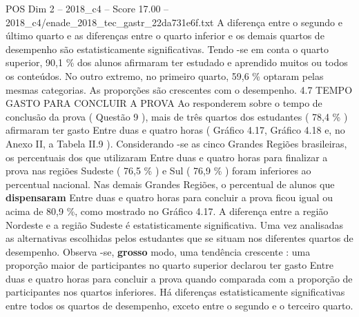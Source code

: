 \begin{textsample}{POS Dim 2 – 2018\_c4 – Score 17.00 – 2018\_c4/enade\_2018\_tec\_gastr\_22da731e6f.txt}
A diferença entre o segundo e último quarto e as diferenças entre o quarto inferior e os demais quartos de desempenho são estatisticamente significativas.
Tendo -se em conta o quarto superior, 90,1 \% dos alunos afirmaram ter estudado e aprendido muitos ou todos os conteúdos.
No outro extremo, no primeiro quarto, 59,6 \% optaram pelas mesmas categorias.
As proporções são crescentes com o desempenho. 4.7 TEMPO GASTO PARA CONCLUIR A PROVA Ao responderem sobre o tempo de conclusão da prova ( Questão 9 ), mais de três quartos dos estudantes ( 78,4 \% ) afirmaram ter gasto Entre duas e quatro horas ( Gráfico 4.17, Gráfico 4.18 e, no Anexo II, a Tabela II.9 ).
Considerando -se as cinco Grandes Regiões brasileiras, os percentuais dos que utilizaram Entre duas e quatro horas para finalizar a prova nas regiões Sudeste ( 76,5 \% ) e Sul ( 76,9 \% ) foram inferiores ao percentual nacional.
Nas demais Grandes Regiões, o percentual de alunos que \textbf{dispensaram} Entre duas e quatro horas para concluir a prova ficou igual ou acima de 80,9 \%, como mostrado no Gráfico 4.17.
A diferença entre a região Nordeste e a região Sudeste é estatisticamente significativa.
Uma vez analisadas as alternativas escolhidas pelos estudantes que se situam nos diferentes quartos de desempenho.
Observa -se, \textbf{grosso} modo, uma tendência crescente : uma proporção maior de participantes no quarto superior declarou ter gasto Entre duas e quatro horas para concluir a prova quando comparada com a proporção de participantes nos quartos inferiores.
Há diferenças estatisticamente significativas entre todos os quartos de desempenho, exceto entre o segundo e o terceiro quarto.

\end{textsample}
